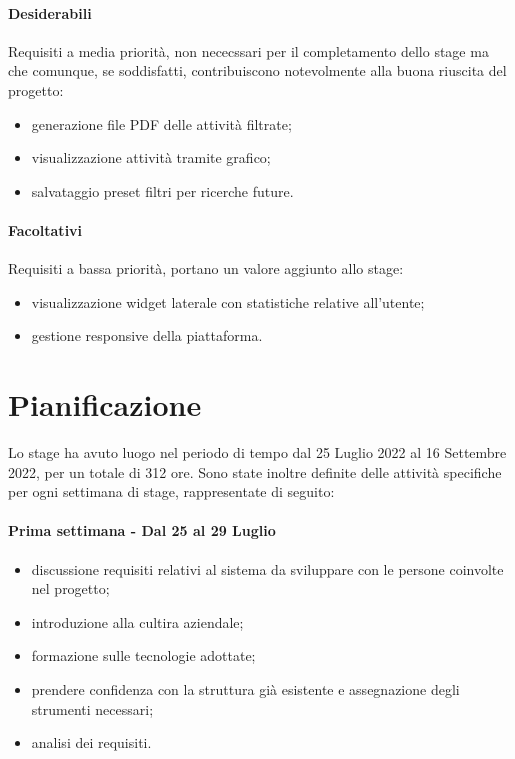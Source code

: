 \paragraph{Desiderabili} Requisiti a media priorità, non nececssari per il completamento dello stage ma che comunque, se soddisfatti, contribuiscono notevolmente alla buona riuscita del progetto: 

\begin{itemize}
  \item generazione file PDF delle attività filtrate;
  \item visualizzazione attività tramite grafico;
  \item salvataggio preset filtri per ricerche future.
\end{itemize} 

\paragraph{Facoltativi} Requisiti a bassa priorità, portano un valore aggiunto allo stage:

\begin{itemize}
  \item visualizzazione widget laterale con statistiche relative all'utente;
  \item gestione responsive della piattaforma.
\end{itemize}

\section{Pianificazione}

Lo stage ha avuto luogo nel periodo di tempo dal 25 Luglio 2022 al 16 Settembre 2022, per un totale di 312 ore.
Sono state inoltre definite delle attività specifiche per ogni settimana di stage, rappresentate di seguito:

\paragraph{Prima settimana - Dal 25 al 29 Luglio}

\begin{itemize}
  \item discussione requisiti relativi al sistema da sviluppare con le persone coinvolte nel progetto;
  \item introduzione alla cultira aziendale;
  \item formazione sulle tecnologie adottate;
  \item prendere confidenza con la struttura già esistente e assegnazione degli strumenti necessari;
  \item analisi dei requisiti.
\end{itemize}

